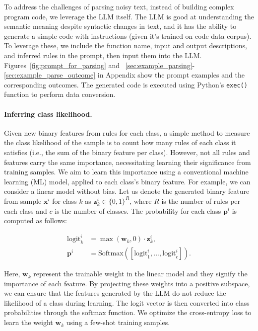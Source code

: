 To address the challenges of parsing noisy text, instead of building complex program code, we leverage the LLM itself. The LLM is good at understanding the semantic meaning despite syntactic changes in text, and it has the ability to generate a simple code with instructions (given it's trained on code data corpus). To leverage these, we include the function name, input and output descriptions, and inferred rules in the prompt, then input them into the LLM. Figures~\ref{fig:prompt_for_parsing} and ~\ref{sec:example_parsing}-\ref{sec:example_parse_outcome} in Appendix show the prompt examples and the corresponding outcomes. The generated code is executed using Python’s \texttt{exec()} function to perform data conversion. 

\vspace*{-0.12in}
\paragraph{Inferring class likelihood.} Given new binary features from rules for each class, a simple method to measure the class likelihood of the sample is to count how many rules of each class it satisfies (i.e., the sum of the binary feature per class). However, not all rules and features carry the same importance, necessitating learning their significance from training samples. We aim to learn this importance using a conventional machine learning (ML) model, applied to each class's binary feature. For example, we can consider a linear model without bias. Let us denote the generated binary feature from sample $\mathbf{x}^i$ for class $k$ as $\mathbf{z}_k^i \in \{0, 1\}^R$, where $R$ is the number of rules per each class and $c$ is the number of classes. The probability for each class $\mathbf{p}^i$ is computed as follows:

\begin{align}
\text{logit}_k^i &= \max(\mathbf{w}_k, 0) \cdot \mathbf{z}_k^i, \nonumber \\
\mathbf{p}^i &= \text{Softmax}({[\text{logit}_{1}^i, ..., \text{logit}_{c}^i]}). \label{eq:infer_prob}
\end{align}

Here, $\mathbf{w}_k$ represent the trainable weight in the linear model and they signify the importance of each feature. By projecting these weights into a positive subspace, we can ensure that the features generated by the LLM do not reduce the likelihood of a class during learning. The logit vector is then converted into class probabilities through the softmax function. We optimize the cross-entropy loss to learn the weight $\mathbf{w}_k$ using a few-shot training samples. 

